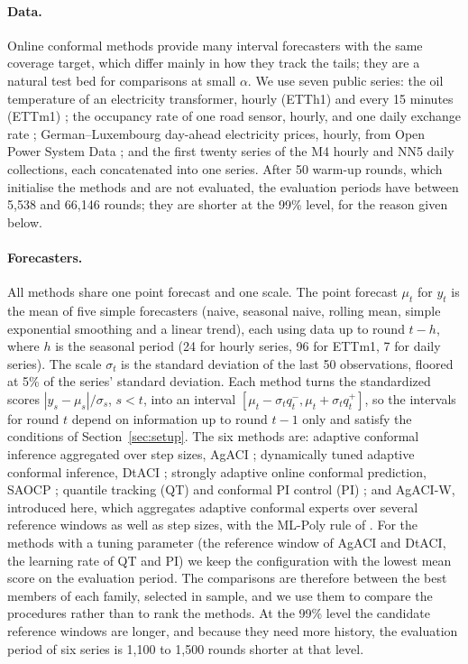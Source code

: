 \paragraph{Data.}
Online conformal methods provide many interval forecasters with the same
coverage target, which differ mainly in how they track the tails; they are
a natural test bed for comparisons at small $\alpha$. We use seven public
series: the oil temperature of an electricity
transformer, hourly (ETTh1) and every 15 minutes (ETTm1)
\citep{zhou2021informer}; the occupancy rate of one road sensor, hourly, and
one daily exchange rate \citep{lai2018modeling}; German--Luxembourg
day-ahead electricity prices, hourly, from Open Power System Data
\citep{wiese2019open}; and the first twenty series of the M4 hourly
\citep{makridakis2020m4} and NN5 daily \citep{godahewa2021monash}
collections, each concatenated into one series. After 50 warm-up rounds,
which initialise the methods and are not evaluated, the evaluation periods
have between 5{,}538 and 66{,}146 rounds; they are shorter at the 99\%
level, for the reason given below.

\paragraph{Forecasters.}
All methods share one point forecast and one scale. The point forecast
$\mu_t$ for $y_t$ is the mean of five simple forecasters (naive, seasonal
naive, rolling mean, simple exponential smoothing and a linear trend), each
using data up to round $t-h$, where $h$ is the seasonal period (24 for
hourly series, 96 for ETTm1, 7 for daily series). The scale $\sigma_t$ is
the standard deviation of the last 50 observations, floored at 5\% of the
series' standard deviation. Each method turns the standardized scores
$|y_s-\mu_s|/\sigma_s$, $s<t$, into an interval
$[\mu_t-\sigma_tq^-_t,\mu_t+\sigma_tq^+_t]$, so the intervals for round $t$
depend on information up to round $t-1$ only and satisfy the conditions of
Section~\ref{sec:setup}. The six methods are: adaptive conformal inference
aggregated over step sizes, AgACI \citep{zaffran2022adaptive}; dynamically
tuned adaptive conformal inference, DtACI \citep{gibbs2024conformal};
strongly adaptive online conformal prediction, SAOCP
\citep{bhatnagar2023improved}; quantile tracking (QT) and conformal PI
control (PI) \citep{angelopoulos2023conformal}; and AgACI-W, introduced
here, which aggregates adaptive conformal experts over several reference windows as
well as step sizes, with the ML-Poly rule of \citet{gaillard2014second}. For the methods
with a tuning parameter (the reference window of AgACI and DtACI, the
learning rate of QT and PI) we keep the configuration with the lowest mean
score on the evaluation period. The comparisons are therefore between the
best members of each family, selected in sample, and we use them to compare
the procedures rather than to rank the methods. At the 99\% level the
candidate reference windows are longer, and because they need more
history, the evaluation period of six series is 1{,}100 to 1{,}500 rounds
shorter at that level.

